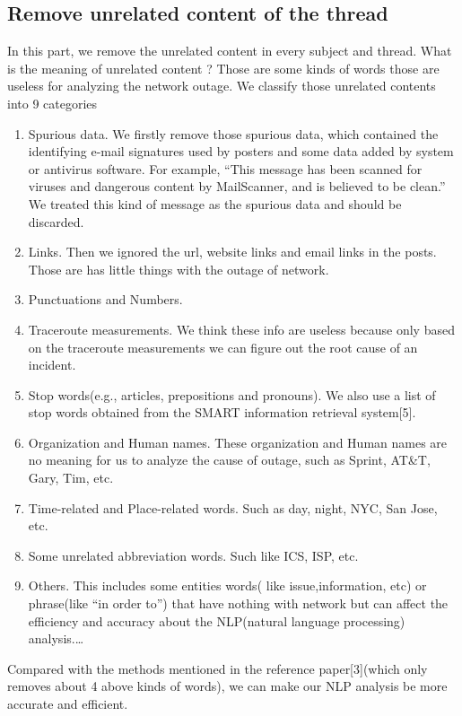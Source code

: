 \documentclass{sig-alternate}
\begin{document}
\subsection{Remove unrelated content of the thread}
In this part, we remove the unrelated content in every subject and thread. What is the meaning of unrelated content ? Those are some kinds of words those are useless for analyzing the network outage. We classify those unrelated contents into 9 categories

\begin{enumerate}
  \item Spurious data. We firstly remove those spurious data, which contained the identifying e-mail signatures used by posters and some data added by system or antivirus software. For example, “This message has been scanned for viruses and dangerous content by MailScanner, and is believed to be clean.” We treated this kind of message as the spurious data and should be discarded. 
  \item Links. Then we ignored the url, website links and email links in the posts. Those are has little things with the outage of network.
  \item Punctuations and Numbers.
  \item Traceroute measurements. We think these info are useless because only based on the traceroute measurements we can figure out the root cause of an incident.
  \item Stop words(e.g., articles, prepositions and pronouns). We also use a list of stop words obtained from the SMART information retrieval system[5].
  \item Organization and Human names. These organization and Human names are no meaning for us to analyze the cause of outage, such as Sprint, AT&T, Gary, Tim, etc.
  \item Time-related and Place-related words. Such as day, night, NYC, San Jose, etc.
  \item Some unrelated abbreviation words. Such like ICS, ISP, etc.
  \item Others.  This includes some entities words( like issue,information, etc) or phrase(like “in order to”) that have nothing with network but can affect the efficiency and accuracy about the NLP(natural language processing) analysis.\ldots
\end{enumerate}
Compared with the methods mentioned in the reference paper[3](which only removes about 4 above kinds of words), we can make our NLP analysis be more accurate and efficient.
\end{document}
